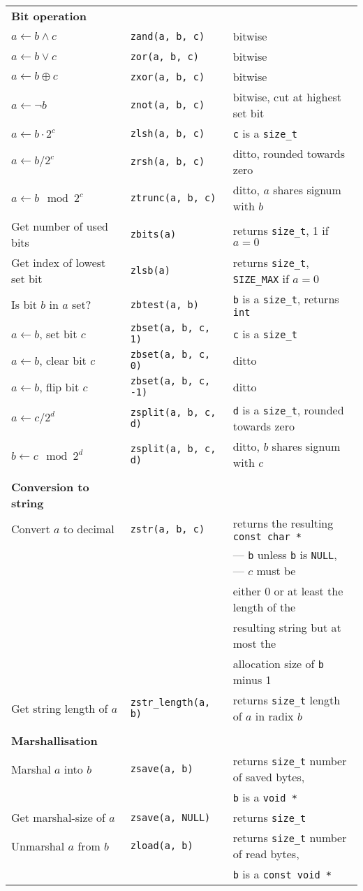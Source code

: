 \documentclass[10pt]{article}
\newcommand{\size}{{\tt size\_t}}
\newcommand{\ullong}{{\tt unsigned long long int}}
\newcommand{\entry}[3]{ #2 & {\tt #1} & #3 \\ }
\newcommand{\cont}[1]{ & & #1 \\ }
\begin{document}
\begin{tabular}{lll}



\textbf{Bit operation} \\
\entry{zand(a, b, c)}      {$a \gets b \wedge c$}         {bitwise}
\entry{zor(a, b, c)}       {$a \gets b \vee c$}           {bitwise}
\entry{zxor(a, b, c)}      {$a \gets b \oplus c$}         {bitwise}
\entry{znot(a, b, c)}      {$a \gets \lnot b$}            {bitwise, cut at highest set bit}
\entry{zlsh(a, b, c)}      {$a \gets b \cdot 2^c$}        {{\tt c} is a \size{}}
\entry{zrsh(a, b, c)}      {$a \gets b / 2^c$}            {ditto, rounded towards zero}
\entry{ztrunc(a, b, c)}    {$a \gets b \mod 2^c$}         {ditto, $a$ shares signum with $b$}
\entry{zbits(a)}           {Get number of used bits}      {returns \size{}, 1 if $a = 0$}
\entry{zlsb(a)}            {Get index of lowest set bit}  {returns \size{}, {\tt SIZE\_MAX} if $a = 0$}
\entry{zbtest(a, b)}       {Is bit $b$ in $a$ set?}       {{\tt b} is a \size{}, returns {\tt int}}
\entry{zbset(a, b, c, 1)}  {$a \gets b$, set bit $c$}     {{\tt c} is a \size{}}
\entry{zbset(a, b, c, 0)}  {$a \gets b$, clear bit $c$}   {ditto}
\entry{zbset(a, b, c, -1)} {$a \gets b$, flip bit $c$}    {ditto}
\entry{zsplit(a, b, c, d)} {$a \gets c / 2^d$}            {{\tt d} is a \size{}, rounded towards zero}
\entry{zsplit(a, b, c, d)} {$b \gets c \mod 2^d$}         {ditto, $b$ shares signum with $c$}
\\

\textbf{Conversion to string} \\
\entry{zstr(a, b, c)}           {Convert $a$ to decimal}   {returns the resulting {\tt const char *}}
\cont                                                      {--- {\tt b} unless {\tt b} is
                                                                {\tt NULL}, --- $c$ must be}
\cont                                                      {either 0 or at least the length of the}
\cont                                                      {resulting string but at most the}
\cont                                                      {allocation size of {\tt b} minus 1}
\entry{zstr\_length(a, b)}      {Get string length of $a$} {returns \size{} length of $a$ in radix $b$}
\\

\textbf{Marshallisation} \\
\entry{zsave(a, b)}    {Marshal $a$ into $b$}    {returns \size{} number of saved bytes,}
\cont                                            {{\tt b} is a {\tt void *}}
\entry{zsave(a, NULL)} {Get marshal-size of $a$} {returns \size{}}
\entry{zload(a, b)}    {Unmarshal $a$ from $b$}  {returns \size{} number of read bytes,}
\cont                                            {{\tt b} is a {\tt const void *}}


\end{tabular}
\end{document}
